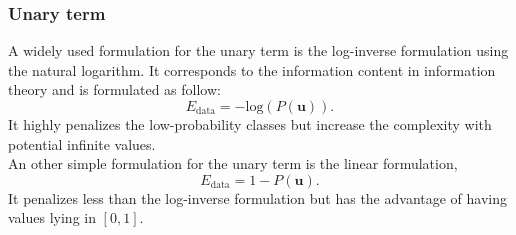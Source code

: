 \subsubsection{Unary term}
A widely used formulation for the unary term is the log-inverse formulation using the natural logarithm. It corresponds to the information content in information theory and is formulated as follow:
\begin{equation}
E_{\text{data}}=-\text{log}(P(\mathbf{u})).
\label{eq:data1}
\end{equation}
It highly penalizes the low-probability classes but increase the complexity with potential infinite values.\\
An other simple formulation for the unary term is the linear formulation,
\begin{equation}
E_{\text{data}}=1-P(\mathbf{u}).
\label{eq:data2}
\end{equation}
It penalizes less than the log-inverse formulation but has the advantage of having values lying in $[0,1]$. \\
